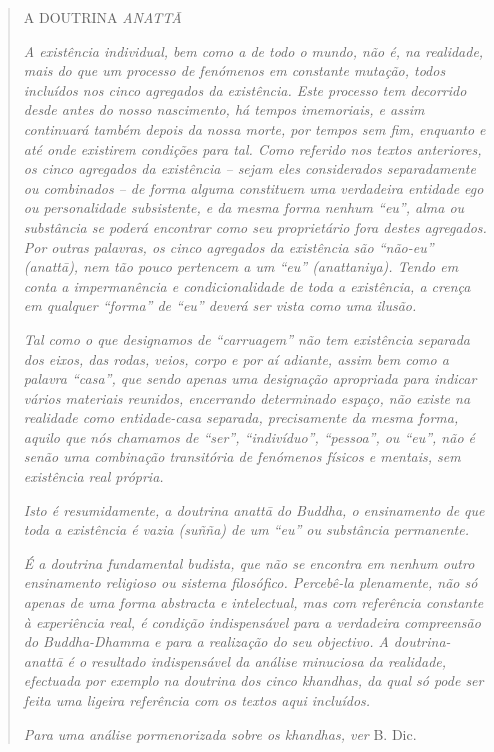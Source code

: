 \begin{quote}
A DOUTRINA \emph{ANATTĀ}

\emph{A existência individual, bem como a de todo o mundo, não é, na realidade, mais do que um processo de fenómenos em constante mutação, todos incluídos nos cinco agregados da existência. Este processo tem decorrido desde antes do nosso nascimento, há tempos imemoriais, e assim continuará também depois da nossa morte, por tempos sem fim, enquanto e até onde existirem condições para tal. Como referido nos textos anteriores, os cinco agregados da existência -- sejam eles considerados separadamente ou combinados -- de forma alguma constituem uma verdadeira entidade ego ou personalidade subsistente, e da mesma forma nenhum ``eu'', alma ou substância se poderá encontrar como seu proprietário fora destes agregados. Por outras palavras, os cinco agregados da existência são ``não-eu'' (anattā), nem tão pouco pertencem a um ``eu'' (anattaniya). Tendo em conta a impermanência e condicionalidade de toda a existência, a crença em qualquer ``forma'' de ``eu'' deverá ser vista como uma ilusão.}

\emph{Tal como o que designamos de ``carruagem'' não tem existência separada dos eixos, das rodas, veios, corpo e por} \emph{aí adiante, assim bem como a palavra ``casa'', que sendo apenas uma designação apropriada para indicar vários materiais reunidos, encerrando determinado espaço, não existe na realidade como entidade-casa separada, precisamente da mesma forma, aquilo que nós chamamos de ``ser'', ``indivíduo'', ``pessoa'', ou ``eu'', não é senão uma combinação transitória de fenómenos físicos e mentais, sem existência real própria.}

\emph{Isto é resumidamente, a doutrina anattā do Buddha, o ensinamento de que toda a existência é vazia (suñña) de um ``eu'' ou substância permanente.}

\emph{É a doutrina fundamental budista, que não se encontra em nenhum outro ensinamento religioso ou sistema filosófico. Percebê-la plenamente, não só apenas de uma forma abstracta e intelectual, mas com referência constante à experiência real, é condição indispensável para a verdadeira compreensão do Buddha-Dhamma e para a realização do seu objectivo. A doutrina-anattā é o resultado indispensável da análise minuciosa da realidade, efectuada por exemplo na doutrina dos cinco khandhas, da qual só pode ser feita uma ligeira referência com os textos aqui incluídos.}

\emph{Para uma análise pormenorizada sobre os khandhas, ver} B. Dic.


\end{quote}
